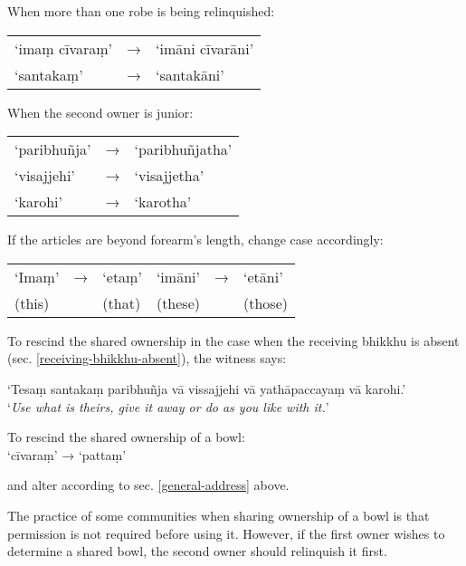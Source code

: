 
\clearpage

When more than one robe is being relinquished:

\begin{tabular}{@{}lll@{}}
‘imaṃ cīvaraṃ’ & → & ‘imāni cīvarāni’\\
‘santakaṃ’ & → & ‘santakāni’\\
\end{tabular}

When the second owner is junior:

\begin{tabular}{@{}lll@{}}
‘paribhuñja’ & → & ‘paribhuñjatha’\\
‘visajjehi’ & → & ‘visajjetha’\\
‘karohi’ & → & ‘karotha’\\
\end{tabular}

If the articles are beyond forearm's length, change case accordingly:

\begin{tabular}{@{}llllll@{}}
‘Imaṃ’ & → & ‘etaṃ’ & ‘imāni’ & → & ‘etāni’\\
(this) &   & (that) & (these) &   & (those)\\
\end{tabular}

To rescind the shared ownership in the case when the receiving bhikkhu is absent
(sec. \ref{receiving-bhikkhu-absent}), the witness says:

‘Tesaṃ santakaṃ paribhuñja vā vissajjehi vā yathāpaccayaṃ vā karohi.’\\
‘\emph{Use what is theirs, give it away or do as you like with it.}’

To rescind the shared ownership of a bowl:\\
‘cīvaraṃ’ → ‘pattaṃ’

and alter according to sec. \ref{general-address} above.

The practice of some communities when sharing ownership of a bowl is that
permission is not required before using it. However, if the first owner wishes
to determine a shared bowl, the second owner should relinquish it first.

